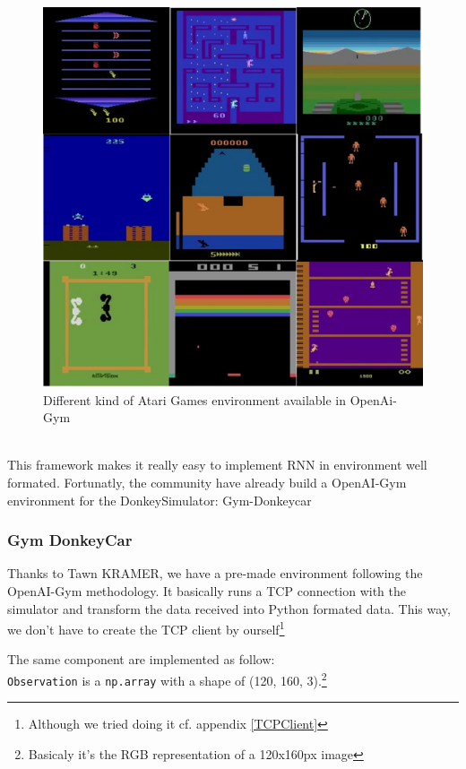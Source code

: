 \begin{figure}[!h]
\centering
\includegraphics[scale=0.15]{img/openai_gym_environment.png}
\caption{Different kind of Atari Games environment available in OpenAi-Gym}
\end{figure}
\clearpage

\hfill \\
This framework makes it really easy to implement RNN in environment well formated. Fortunatly, the community have already build a OpenAI-Gym environment for the DonkeySimulator: Gym-Donkeycar


\subsubsection*{Gym DonkeyCar}

Thanks to Tawn KRAMER\cite{GymDonkey}, we have a pre-made environment following the OpenAI-Gym methodology. It basically runs a TCP connection with the simulator and transform the data received into Python formated data. This way, we don't have to create the TCP client by ourself\footnote{Although we tried doing it cf. appendix \ref{TCPClient}}

 The same component are implemented as follow:\\

\texttt{Observation} is a \texttt{np.array} with a shape of (120, 160, 3).\footnote{Basicaly it's the RGB representation of a 120x160px image}\\

